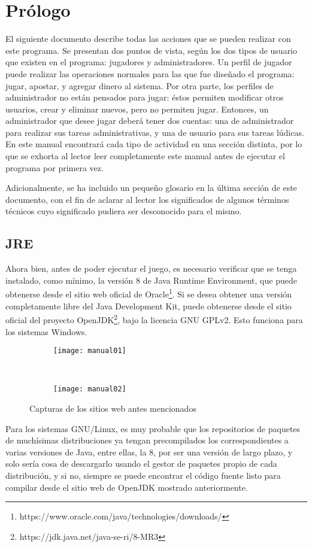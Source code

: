 \documentclass[titlepage,letterpaper,12pt]{article}
\begin{document}

\tableofcontents

\section{Prólogo}
El siguiente documento describe todas las acciones que se pueden realizar con este programa. Se presentan dos puntos de vista, según los dos tipos de usuario que existen en el programa: jugadores y administradores. Un perfil de jugador puede realizar las operaciones normales para las que fue diseñado el programa: jugar, apostar, y agregar dinero al sistema. Por otra parte, los perfiles de administrador no están pensados para jugar: éstos permiten modificar otros usuarios, crear y eliminar nuevos, pero no permiten jugar. Entonces, un administrador que desee jugar deberá tener dos cuentas: una de administrador para realizar sus tareas administrativas, y una de usuario para sus tareas lúdicas. En este manual encontrará cada tipo de actividad en una sección distinta, por lo que se exhorta al lector leer completamente este manual antes de ejecutar el programa por primera vez.

Adicionalmente, se ha incluido un pequeño glosario en la última sección de este documento, con el fin de aclarar al lector los significados de algunos términos técnicos cuyo significado pudiera ser desconocido para el mismo.

\subsection{JRE}
Ahora bien, antes de poder ejecutar el juego, es necesario verificar que se tenga instalado, como mínimo, la versión 8 de Java Runtime Environment, que puede obtenerse desde el sitio web oficial de Oracle\footnote{https://www.oracle.com/java/technologies/downloads/}. Si se desea obtener una versión completamente libre del Java Development Kit, puede obtenerse desde el sitio oficial del proyecto OpenJDK\footnote{https://jdk.java.net/java-se-ri/8-MR3}, bajo la licencia GNU GPLv2. Esto funciona para los sistemas Windows.

\begin{figure}[h]
  \centering
  \begin{subfigure}[b]{.5\textwidth}
    \texttt{[image: manual01]}
  \end{subfigure}
  ~
  \begin{subfigure}[b]{.3\textwidth}
    \texttt{[image: manual02]}
  \end{subfigure}
  \caption{Capturas de los sitios web antes mencionados}
\end{figure}
Para los sistemas GNU/Linux, es muy probable que los repositorios de paquetes de muchísimas distribuciones ya tengan precompilados los correspondientes a varias versiones de Java, entre ellas, la 8, por ser una versión de largo plazo, y solo sería cosa de descargarlo usando el gestor de paquetes propio de cada distribución, y si no, siempre se puede encontrar el código fuente listo para compilar desde el sitio web de OpenJDK mostrado anteriormente.
\end{document}

